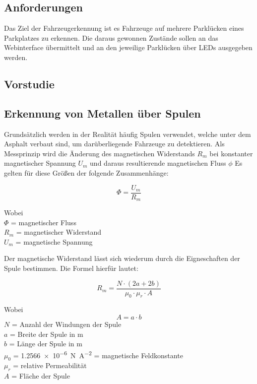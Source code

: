 \def \sectionauthors {Dennis Köb}
\subsection{Anforderungen}
Das Ziel der Fahrzeugerkennung ist es Fahrzeuge auf mehrere Parklücken eines Parkplatzes zu erkennen. Die daraus 
gewonnen Zustände sollen an das Webinterface übermittelt und an den jeweilige Parklücken über LEDs ausgegeben werden. 
\subsection{Vorstudie}

\subsection{Erkennung von Metallen über Spulen}
Grundsätzlich werden in der Realität häufig Spulen verwendet, welche unter dem Asphalt verbaut sind, um darüberliegende
Fahrzeuge zu detektieren. Als Messprinzip wird die Änderung des magnetischen Widerstands $R_{m}$ bei konstanter magnetischer Spannung $U_{m}$ und
daraus resultierende magnetischen Fluss $\phi$
Es gelten für diese Größen der folgende Zusammenhänge:

\begin{equation} \label{eq:phi}
    \Phi = \frac{U_{m}}{R_{m}}
\end{equation}

Wobei \\
$\Phi$ = magnetischer Fluss \\
$R_{m}$ = magnetischer Widerstand \\
$U_{m}$ = magnetische Spannung
\pagebreak

Der magnetische Widerstand lässt sich wiederum durch die Eigneschaften der Spule bestimmen. Die Formel hierfür lautet:

\begin{equation} \label{eq:Rm}
    R_{m} = \frac{N \cdot (2a + 2b)}{\mu_{0} \cdot \mu_{r} \cdot A} 
\end{equation}


Wobei \\
\begin{equation} \label{eq:A}
    A = a \cdot b
\end{equation}
$N$ = Anzahl der Windungen der Spule \\
$a$ = Breite der Spule in m \\
$b$ = Länge der Spule in m\\
$\mu_{0}$ = \SI[per-mode = symbol]{1.2566e-6}{\newton\per\ampere\squared} = magnetische Feldkonstante \\
$\mu_{r}$ = relative Permeabilität  \\
$A$ = Fläche der Spule

